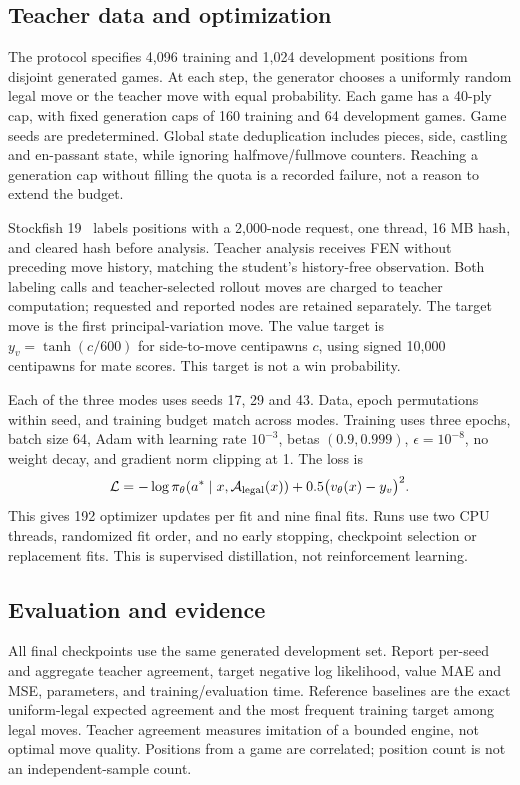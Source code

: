 \documentclass[10pt]{article}
\begin{document}
\subsection{Teacher data and optimization}
The protocol specifies 4,096 training and 1,024 development positions from
disjoint generated games. At each step, the generator chooses a uniformly
random legal move or the teacher move with equal probability. Each game has a
40-ply cap, with fixed generation caps of 160 training and 64 development games.
Game seeds are predetermined. Global state deduplication includes pieces, side,
castling and en-passant state, while ignoring halfmove/fullmove counters.
Reaching a generation cap without filling the quota is a recorded failure,
not a reason to extend the budget.

Stockfish 19~\cite{stockfish} labels positions with a 2,000-node request,
one thread, 16 MB hash, and cleared hash before analysis. Teacher analysis
receives FEN without preceding move history, matching the student's history-free
observation. Both labeling calls and teacher-selected rollout moves are charged
to teacher computation; requested and reported nodes are retained separately.
The target move is the first principal-variation move. The value target is
$y_v=\tanh(c/600)$ for side-to-move centipawns $c$, using signed 10,000 centipawns
for mate scores. This target is not a win probability.

Each of the three modes uses seeds 17, 29 and 43. Data, epoch permutations
within seed, and training budget match across modes. Training uses three epochs,
batch size 64, Adam with learning rate $10^{-3}$, betas $(0.9,0.999)$,
$\epsilon=10^{-8}$, no weight decay, and gradient norm clipping at 1.
The loss is
\begin{equation}
 \mathcal{L}=-\log\pi_\theta(a^*\mid x,\mathcal{A}_{\rm legal}(x))
                 +0.5\bigl(v_\theta(x)-y_v\bigr)^2.
\end{equation}
This gives 192 optimizer updates per fit and nine final fits. Runs use two CPU
threads, randomized fit order, and no early stopping, checkpoint selection or
replacement fits. This is supervised distillation, not reinforcement learning.

\subsection{Evaluation and evidence}
All final checkpoints use the same generated development set. Report per-seed
and aggregate teacher agreement, target negative log likelihood, value MAE and
MSE, parameters, and training/evaluation time. Reference baselines are the exact
uniform-legal expected agreement and the most frequent training target among
legal moves. Teacher agreement measures imitation of a bounded engine, not
optimal move quality. Positions from a game are correlated; position count is
not an independent-sample count.
\end{document}
